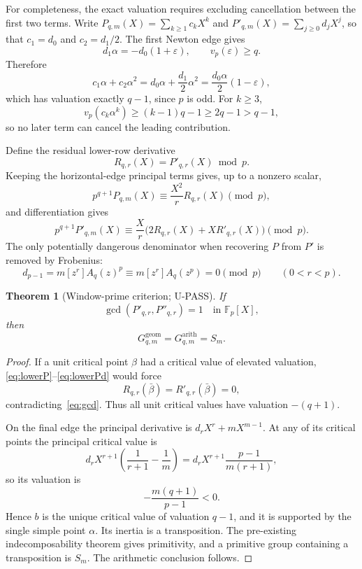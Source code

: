 \documentclass[11pt]{article}
\theoremstyle{keio}
\newtheorem{theorem}{Theorem}[section]
\theoremstyle{definition}
\theoremstyle{remark}
\newcommand{\F}{\mathbb F}
\newcommand{\UPASS}{\textcolor{keiogreen}{\textsf{U-PASS}}}
\begin{document}
For completeness, the exact valuation requires excluding cancellation
between the first two terms.  Write
$P_{q,m}(X)=\sum_{k\ge1}c_kX^k$ and
$P'_{q,m}(X)=\sum_{j\ge0}d_jX^j$, so that $c_1=d_0$ and
$c_2=d_1/2$.  The first Newton edge gives
\[
 d_1\alpha=-d_0(1+\varepsilon),\qquad v_p(\varepsilon)\ge q.
\]
Therefore
\[
 c_1\alpha+c_2\alpha^2
 =d_0\alpha+\frac{d_1}{2}\alpha^2
 =\frac{d_0\alpha}{2}(1-\varepsilon),
\]
which has valuation exactly $q-1$, since $p$ is odd.  For $k\ge3$,
\[
 v_p(c_k\alpha^k)\ge(k-1)q-1\ge2q-1>q-1,
\]
so no later term can cancel the leading contribution.

Define the residual lower-row derivative
\[
R_{q,r}(X)=P'_{q,r}(X)\bmod p.
\]
Keeping the horizontal-edge principal terms gives, up to a nonzero scalar,
\begin{equation}
p^{q+1}P_{q,m}(X)\equiv\frac{X^2}{r}R_{q,r}(X)\pmod p,
\label{eq:lowerP}
\end{equation}
and differentiation gives
\begin{equation}
p^{q+1}P'_{q,m}(X)
\equiv\frac{X}{r}\bigl(2R_{q,r}(X)+XR'_{q,r}(X)\bigr)\pmod p.
\label{eq:lowerPd}
\end{equation}
The only potentially dangerous denominator when recovering $P$ from $P'$ is
removed by Frobenius:
\begin{equation}
d_{p-1}=m[z^r]A_q(z)^p
\equiv m[z^r]A_q(z^p)=0\pmod p
\qquad(0<r<p).
\label{eq:frob}
\end{equation}

\begin{theorem}[Window-prime criterion; \UPASS]\label{thm:window}
If
\begin{equation}
\gcd(P'_{q,r},P''_{q,r})=1
\quad\text{in }\F_p[X],
\label{eq:gcd}
\end{equation}
then
\begin{equation}
\boxed{G^{\mathrm{geom}}_{q,m}=G^{\mathrm{arith}}_{q,m}=S_m.}
\label{eq:window-mon}
\end{equation}
\end{theorem}

\begin{proof}
If a unit critical point $\beta$ had a critical value of elevated
valuation, \eqref{eq:lowerP}--\eqref{eq:lowerPd} would force
\[
R_{q,r}(\bar\beta)=R'_{q,r}(\bar\beta)=0,
\]
contradicting~\eqref{eq:gcd}. Thus all unit critical values have valuation
$-(q+1)$.

On the final edge the principal derivative is
$d_rX^r+mX^{m-1}$. At any of its critical points the principal critical
value is
\[
d_rX^{r+1}
\left(\frac1{r+1}-\frac1m\right)
=d_rX^{r+1}\frac{p-1}{m(r+1)},
\]
so its valuation is
\[
-\frac{m(q+1)}{p-1}<0.
\]
Hence $b$ is the unique critical value of valuation $q-1$, and it is
supported by the single simple point $\alpha$. Its inertia is a
transposition. The pre-existing indecomposability theorem gives primitivity,
and a primitive group containing a transposition is $S_m$. The arithmetic
conclusion follows.
\end{proof}
\end{document}
